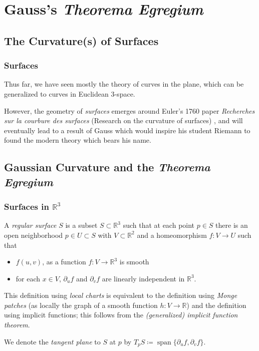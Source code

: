 \documentclass[handout]{beamer}
\DeclareMathOperator{\Span}{span}
\newcommand{\R}{\mathbb{R}}
\theoremstyle{definition}
\begin{document}
\section{Gauss's \emph{Theorema Egregium}}

\subsection{The Curvature(s) of Surfaces}

\begin{frame}
    \frametitle{Surfaces}

    \pause
    Thus far, we have seen mostly the theory of curves  in the plane,
    which can be generalized to curves in Euclidean 3-space.

    \pause
    However, the geometry of \emph{surfaces} emerges around Euler's 1760
    paper \textit{Recherches sur la courbure des surfaces} (Research on
    the curvature of surfaces) \cite{geom-diff-view,euler}, and will eventually
    lead to a result of Gauss which would inspire his student Riemann to
    found the modern theory which bears his name.

\end{frame}

\subsection{Gaussian Curvature and the \emph{Theorema Egregium}}

\begin{frame}
    \frametitle{Surfaces in $\R^3$}

    \pause
    \begin{definition}
        A \emph{regular surface} $S$ is a subset $S \subset \R^3$ such that at each point
        $p \in S$ there is an open neighborhood $p \in U \subset S$ with $V \subset \R^2$
        and a homeomorphism $f : V \to U$ such that
        \begin{itemize}
            \item $f(u,v)$, as a function $f : V \to \R^3$ is smooth
            \item for each $x \in V$, $\partial_u f$ and $\partial_v f$ are
            linearly independent in $\R^3$.
        \end{itemize}
    \end{definition}

    \pause
    This definition using \emph{local charts} is equivalent
    to the definition using \emph{Monge patches} (as locally the graph
    of a smooth function $h : V \to \R$) and the definition using implicit functions;
    this follows from the \emph{(generalized) implicit function theorem}.

    \pause
    We denote the \emph{tangent plane} to $S$ at $p$ by
    \(
        T_pS \coloneqq \Span\{\partial_uf,\partial_vf\}.
    \)
\end{frame}
\end{document}
